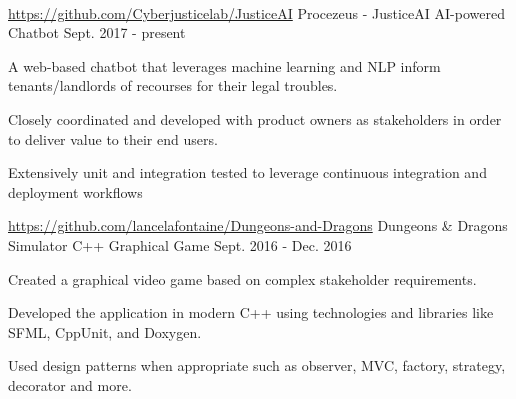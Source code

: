 \ \vspace{10mm}

\begin{cventries}
  \cventry
  {\small \href{https://github.com/Cyberjusticelab/JusticeAI}{https://github.com/Cyberjusticelab/JusticeAI}} %
  {\normalsize Procezeus - JusticeAI} %
  {\small AI-powered Chatbot } %
  {\small Sept. 2017 - present} %
    {
      \begin{cvitems} %
      \item \small A web-based chatbot that leverages machine learning and NLP inform tenants/landlords of recourses for their legal troubles.
      \item \small Closely coordinated and developed with product owners as stakeholders in order to deliver value to their end users.
      \item \small Extensively unit and integration tested to leverage continuous integration and deployment workflows
      \end{cvitems}
    }

  \cventry
  {\small \href{https://github.com/lancelafontaine/Dungeons-and-Dragons}{https://github.com/lancelafontaine/Dungeons-and-Dragons}} %
    {\normalsize Dungeons \& Dragons Simulator} %
    {\small C++ Graphical Game} %
    {\small Sept. 2016 - Dec. 2016} %
    {
      \begin{cvitems} %
      \item \small Created a graphical video game based on complex stakeholder requirements.
      \item \small Developed the application in modern C++ using technologies and libraries like SFML, CppUnit, and Doxygen.
      \item \small Used design patterns when appropriate such as observer, MVC, factory, strategy, decorator and more.
      \end{cvitems}
    }


\end{cventries}
